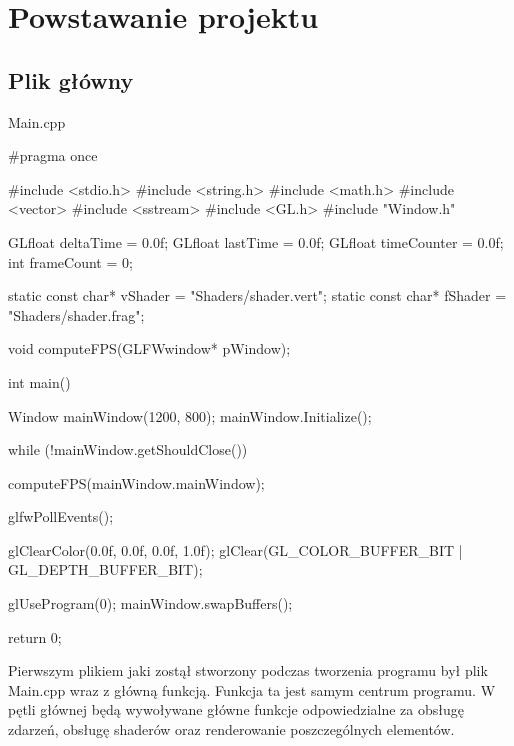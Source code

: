\documentclass[a4paper,12pt]{article}
\numberwithin{equation}{section}
\begin{document}
\section{Powstawanie projektu}

\subsection{Plik główny}

\begin{center}
    Main.cpp
\end{center}

\begin{cppcode}
#pragma once

#include <stdio.h>
#include <string.h>
#include <math.h>
#include <vector>
#include <sstream>
#include <GL\glew.h>
#include "Window.h"

GLfloat deltaTime = 0.0f;
GLfloat lastTime = 0.0f;
GLfloat timeCounter = 0.0f;
int frameCount = 0;

static const char* vShader = "Shaders/shader.vert";
static const char* fShader = "Shaders/shader.frag";

void computeFPS(GLFWwindow* pWindow);

int main()
{
	Window mainWindow(1200, 800);
	mainWindow.Initialize();

	while (!mainWindow.getShouldClose())
	{
		computeFPS(mainWindow.mainWindow);

		glfwPollEvents();

		glClearColor(0.0f, 0.0f, 0.0f, 1.0f);
		glClear(GL_COLOR_BUFFER_BIT | GL_DEPTH_BUFFER_BIT);

		glUseProgram(0);
		mainWindow.swapBuffers();
	}

	return 0;
}
\end{cppcode}

Pierwszym plikiem jaki zostął stworzony podczas tworzenia programu był plik Main.cpp wraz z główną funkcją. Funkcja ta jest samym centrum programu. W pętli głównej będą wywoływane główne funkcje odpowiedzialne za obsługę zdarzeń, obsługę shaderów oraz renderowanie poszczególnych elementów.
\end{document}
